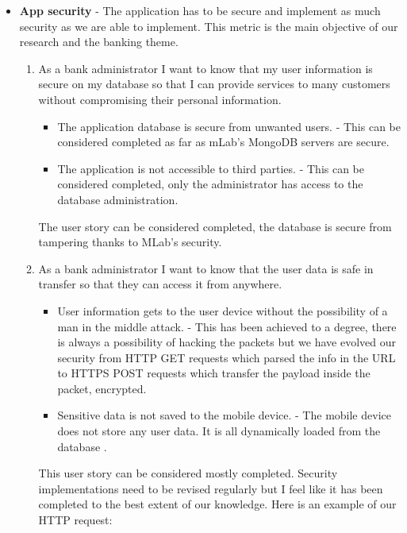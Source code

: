 \begin{itemize}
    \item  \textbf{App security} - The application has to be secure and implement as much security as we are able to implement. This metric is the main objective of our research and the banking theme.
        \begin{enumerate}
        \item As a bank administrator I want to know that my user information is secure on my database so that I can provide services to many customers without compromising their personal information.
        \begin{itemize}
                \item The application database is secure from unwanted users. - This can be considered completed as far as mLab's MongoDB servers are secure.
                \item The application is not accessible to third parties. - This can be considered completed, only the administrator has access to the database administration.
            \end{itemize}
            The user story can be considered completed, the database is secure from tampering thanks to MLab's security.
        \item As a bank administrator I want to know that the user data is safe in transfer so that they can access it from anywhere.
            \begin{itemize}
                \item User information gets to the user device without the possibility of a man in the middle attack. - This has been achieved to a degree, there is always a possibility of hacking the packets but we have evolved our security from HTTP GET requests which parsed the info in the URL to HTTPS POST requests which transfer the payload inside the packet, encrypted.
                \item Sensitive data is not saved to the mobile device. - The mobile device does not store any user data. It is all dynamically loaded from the database
.
            \end{itemize}
            This user story can be considered mostly completed. Security implementations need to be revised regularly but I feel like it has been completed to the best extent of our knowledge.
            Here is an example of our HTTP request:


\end{enumerate}
\end{itemize}
